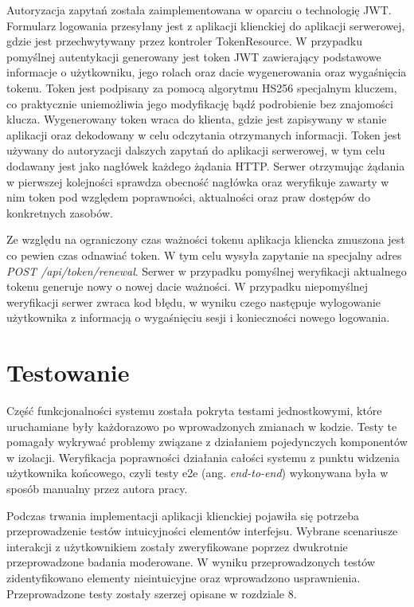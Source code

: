 Autoryzacja zapytań została zaimplementowana w oparciu o technologię JWT. Formularz logowania przesyłany jest z aplikacji klienckiej do aplikacji serwerowej, gdzie jest przechwytywany przez kontroler TokenResource. W przypadku pomyślnej autentykacji generowany jest token JWT zawierający podstawowe informacje o użytkowniku, jego rolach oraz dacie wygenerowania oraz wygaśnięcia tokenu. Token jest podpisany za pomocą algorytmu HS256 specjalnym kluczem, co praktycznie uniemożliwia jego modyfikację bądź podrobienie bez znajomości klucza. Wygenerowany token wraca do klienta, gdzie jest zapisywany w stanie aplikacji oraz dekodowany w celu odczytania otrzymanych informacji. Token jest używany do autoryzacji dalszych zapytań do aplikacji serwerowej, w tym celu dodawany jest jako nagłówek każdego żądania HTTP. Serwer otrzymując żądania w pierwszej kolejności sprawdza obecność nagłówka oraz weryfikuje zawarty w nim token pod względem poprawności, aktualności oraz praw dostępów do konkretnych zasobów. 

Ze względu na ograniczony czas ważności tokenu aplikacja kliencka zmuszona jest co pewien czas odnawiać token. W tym celu wysyła zapytanie na specjalny adres \textit{POST /api/token/renewal}. Serwer w przypadku pomyślnej weryfikacji aktualnego tokenu generuje nowy o nowej dacie ważności. W przypadku niepomyślnej weryfikacji serwer zwraca kod błędu, w wyniku czego następuje wylogowanie użytkownika z informacją o wygaśnięciu sesji i konieczności nowego logowania.

\section{Testowanie}

Część funkcjonalności systemu została pokryta testami jednostkowymi, które uruchamiane były każdorazowo po wprowadzonych zmianach w kodzie. Testy te pomagały wykrywać problemy związane z działaniem pojedynczych komponentów w izolacji. Weryfikacja poprawności działania całości systemu z punktu widzenia użytkownika końcowego, czyli testy e2e (ang. \textit{end-to-end}) wykonywana była w sposób manualny przez autora pracy.

Podczas trwania implementacji aplikacji klienckiej pojawiła się potrzeba przeprowadzenie testów intuicyjności elementów interfejsu. Wybrane scenariusze interakcji z użytkownikiem zostały zweryfikowane poprzez dwukrotnie przeprowadzone badania moderowane. W wyniku przeprowadzonych testów zidentyfikowano elementy nieintuicyjne oraz wprowadzono usprawnienia. Przeprowadzone testy zostały szerzej opisane w rozdziale 8.


